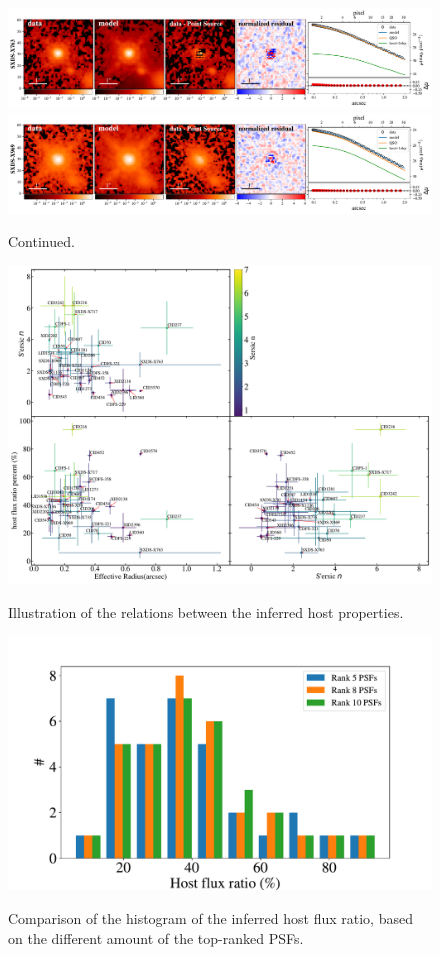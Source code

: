 \documentclass[apj]{emulateapj}
\begin{document}
\begin{figure}
\centering
{
\includegraphics[height=0.25\textwidth]{fig/best_fit_SXDS-X763_SB_profile.pdf}
\includegraphics[height=0.25\textwidth]{fig/best_fit_SXDS-X969_SB_profile.pdf}
}
\caption{Continued.}
\end{figure} 

\begin{figure}
\centering
{
\includegraphics[height=0.75\textwidth]{fig/flux_r_n_corner.pdf}
}
\caption{\label{fig:flux_r_n_corner}
Illustration of the relations between the inferred host properties.}
\end{figure} 

\begin{figure}
\centering
{
\includegraphics[height=0.35\textwidth]{fig/hist_compare.pdf}
}
\caption{\label{fig:hist_compare} 
Comparison of the histogram of the inferred host flux ratio, based on the different amount of the top-ranked PSFs.}
\end{figure} 

\end{document}
